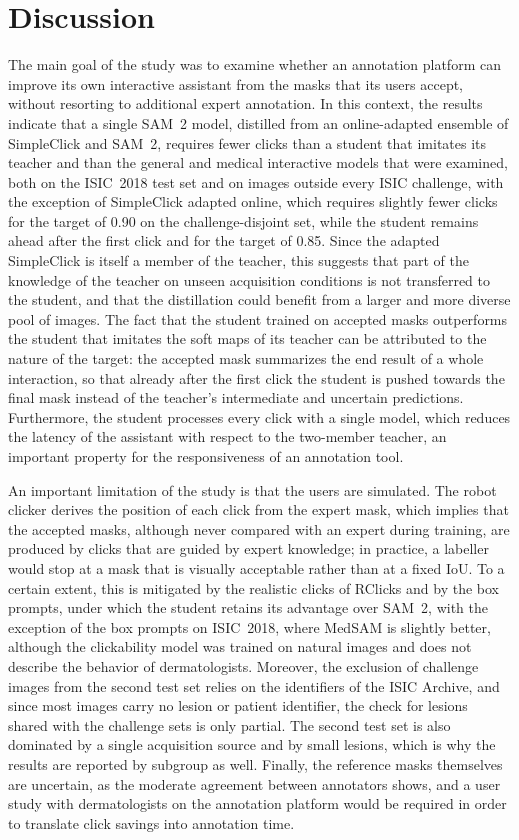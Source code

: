\documentclass[runningheads]{llncs}
\begin{document}
\section{Discussion}\label{sec:discussion}

The main goal of the study was to examine whether an annotation platform can improve its own interactive assistant from the masks that its users accept, without resorting to additional expert annotation. In this context, the results indicate that a single SAM~2 model, distilled from an online-adapted ensemble of SimpleClick and SAM~2, requires fewer clicks than a student that imitates its teacher and than the general and medical interactive models that were examined, both on the ISIC~2018 test set and on images outside every ISIC challenge, with the exception of SimpleClick adapted online, which requires slightly fewer clicks for the target of 0.90 on the challenge-disjoint set, while the student remains ahead after the first click and for the target of 0.85. Since the adapted SimpleClick is itself a member of the teacher, this suggests that part of the knowledge of the teacher on unseen acquisition conditions is not transferred to the student, and that the distillation could benefit from a larger and more diverse pool of images. The fact that the student trained on accepted masks outperforms the student that imitates the soft maps of its teacher can be attributed to the nature of the target: the accepted mask summarizes the end result of a whole interaction, so that already after the first click the student is pushed towards the final mask instead of the teacher's intermediate and uncertain predictions. Furthermore, the student processes every click with a single model, which reduces the latency of the assistant with respect to the two-member teacher, an important property for the responsiveness of an annotation tool.

An important limitation of the study is that the users are simulated. The robot clicker derives the position of each click from the expert mask, which implies that the accepted masks, although never compared with an expert during training, are produced by clicks that are guided by expert knowledge; in practice, a labeller would stop at a mask that is visually acceptable rather than at a fixed IoU. To a certain extent, this is mitigated by the realistic clicks of RClicks and by the box prompts, under which the student retains its advantage over SAM~2, with the exception of the box prompts on ISIC~2018, where MedSAM is slightly better, although the clickability model was trained on natural images and does not describe the behavior of dermatologists. Moreover, the exclusion of challenge images from the second test set relies on the identifiers of the ISIC Archive, and since most images carry no lesion or patient identifier, the check for lesions shared with the challenge sets is only partial. The second test set is also dominated by a single acquisition source and by small lesions, which is why the results are reported by subgroup as well. Finally, the reference masks themselves are uncertain, as the moderate agreement between annotators shows, and a user study with dermatologists on the annotation platform would be required in order to translate click savings into annotation time.
\end{document}
